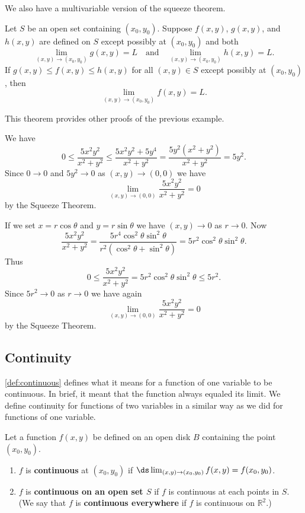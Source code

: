 We also have a multivariable version of the squeeze theorem.

\begin{theorem}\label{thm:multi_squeeze}%
Let $S$ be an open set containing $(x_0, y_0)$.  Suppose $f(x, y)$, $g(x, y)$, and $h(x, y)$ are defined on $S$ except possibly at $(x_0, y_0)$ and both
\[
\lim_{(x,y)\to(x_0, y_0)}g(x, y)=L
\quad\text{and}\quad
\lim_{(x,y)\to(x_0, y_0)} h(x, y) = L.
\]
If $g(x,y)\leq f(x, y)\leq h(x,y)$ for all $(x,y)\in S$ except possibly at $(x_0, y_0)$, then
\[\lim_{(x,y)\to(x_0, y_0)}f(x, y)=L.\]
\end{theorem}

This theorem provides other proofs of the previous example.

\begin{example}\label{ex_multlimit5b}%
We have 
\[
0\leq\frac{5x^2y^2}{x^2+y^2}\leq\frac{5x^2y^2+5y^4}{x^2+y^2}
=\frac{5y^2(x^2+y^2)}{x^2+y^2}=5y^2.
\]
Since $0\to0$ and $5y^2\to0$ as $(x,y)\to(0,0)$ we have 
\[\lim_{(x,y)\to(0,0)}\frac{5x^2y^2}{x^2+y^2}=0\]
by the Squeeze Theorem.

If we set $x = r \cos \theta$ and $y = r \sin \theta$ we have $(x, y) \rightarrow 0$ as $r \rightarrow 0$.  Now
\[
\frac{5x^2y^2}{x^2+y^2}
=\frac{5r^4\cos^2\theta\sin^2\theta}{r^2(\cos^2\theta +\sin^2\theta)}
=5r^2\cos^2\theta\sin^2\theta.
\]
Thus 
\[0\leq\frac{5x^2y^2}{x^2+y^2}=5r^2\cos^2\theta\sin^2\theta\leq5r^2.\]
Since $5r^2\to0$ as $r\to0$ we have again
\[\lim_{(x,y)\to(0,0)}\frac{5x^2y^2}{x^2+y^2}=0\]
by the Squeeze Theorem.
\end{example}

\subsection{Continuity}

\autoref{def:continuous} defines what it means for a function of one variable to be continuous. In brief, it meant that the function always equaled its limit. We define continuity for functions of two variables in a similar way as we did for functions of one variable.

\begin{definition}[Continuous]\label{def:multi_continuous}%
Let a function $f(x,y)$ be defined on an open disk $B$ containing the point $(x_0,y_0)$.
\begin{enumerate}
	\item $f$ is \textbf{continuous} at $(x_0,y_0)$ if $\ds\lim_{(x,y)\to(x_0,y_0)} f(x,y) = f(x_0,y_0)$.
	\item	$f$ is \textbf{continuous on an open set $S$} if $f$ is continuous at each points in $S$. (We say that $f$ is \textbf{continuous everywhere} if $f$ is continuous on $\mathbb{R}^2$.)
\end{enumerate}
\end{definition}


